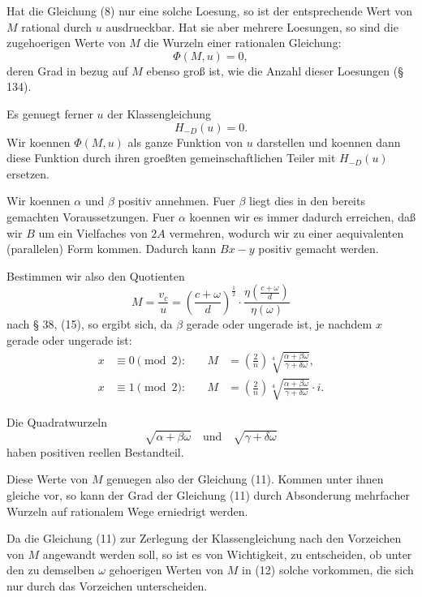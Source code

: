 \documentclass[12pt,a4paper]{article}
\theoremstyle{plain}
\theoremstyle{definition}
\theoremstyle{remark}
\begin{document}
Hat die Gleichung (8) nur eine solche Loesung, so ist der entsprechende Wert von $M$ rational durch $u$ ausdrueckbar. Hat sie aber mehrere Loesungen, so sind die zugehoerigen Werte von $M$ die Wurzeln einer rationalen Gleichung:
\begin{equation}\label{eq:136_11}
\Phi(M, u) = 0,
\end{equation}
deren Grad in bezug auf $M$ ebenso gro\ss{} ist, wie die Anzahl dieser Loesungen (\S{} 134).

Es genuegt ferner $u$ der Klassengleichung
\[
H_{-D}(u) = 0.
\]
Wir koennen $\Phi(M, u)$ als ganze Funktion von $u$ darstellen und koennen dann diese Funktion durch ihren groe\ss{}ten gemeinschaftlichen Teiler mit $H_{-D}(u)$ ersetzen.

\newpage

Wir koennen $\alpha$ und $\beta$ positiv annehmen. Fuer $\beta$ liegt dies in den bereits gemachten Voraussetzungen. Fuer $\alpha$ koennen wir es immer dadurch erreichen, da\ss{} wir $B$ um ein Vielfaches von $2A$ vermehren, wodurch wir zu einer aequivalenten (parallelen) Form kommen. Dadurch kann $Bx - y$ positiv gemacht werden.

Bestimmen wir also den Quotienten
\[
M = \frac{v_c}{u} = \left(\frac{c + \omega}{d}\right)^{\frac{1}{2}} \cdot \frac{\eta\left(\frac{c + \omega}{d}\right)}{\eta(\omega)}
\]
nach \S{} 38, (15), so ergibt sich, da $\beta$ gerade oder ungerade ist, je nachdem $x$ gerade oder ungerade ist:
\begin{equation}\label{eq:136_12}
\begin{aligned}
x &\equiv 0 \pmod{2}: &\quad M &= \left(\frac{2}{n}\right) \sqrt[4]{\frac{\alpha + \beta\omega}{\gamma + \delta\omega}}, \\
x &\equiv 1 \pmod{2}: &\quad M &= \left(\frac{2}{n}\right) \sqrt[4]{\frac{\alpha + \beta\omega}{\gamma + \delta\omega}} \cdot i.
\end{aligned}
\end{equation}

Die Quadratwurzeln
\[
\sqrt{\alpha + \beta\omega} \quad \text{und} \quad \sqrt{\gamma + \delta\omega}
\]
haben positiven reellen Bestandteil.

Diese Werte von $M$ genuegen also der Gleichung (11). Kommen unter ihnen gleiche vor, so kann der Grad der Gleichung (11) durch Absonderung mehrfacher Wurzeln auf rationalem Wege erniedrigt werden.

Da die Gleichung (11) zur Zerlegung der Klassengleichung nach den Vorzeichen von $M$ angewandt werden soll, so ist es von Wichtigkeit, zu entscheiden, ob unter den zu demselben $\omega$ gehoerigen Werten von $M$ in (12) solche vorkommen, die sich nur durch das Vorzeichen unterscheiden.
\end{document}
